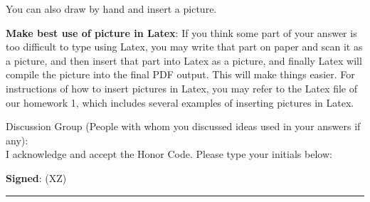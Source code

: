 \documentclass[12pt]{article}
\begin{document}
You can also draw by hand and insert a picture.

\vspace{.5cm}

\textbf{Make best use of picture in Latex}: If you think some part of your answer is too difficult to type using Latex, you may write that part on paper and scan it as a picture, and then insert that part into Latex as a picture, and finally Latex will compile the picture into the final PDF output. This will make things easier. For instructions of how to insert pictures in Latex, you may refer to the Latex file of our homework 1, which includes several examples of inserting pictures in Latex.


\hrulefill

Discussion Group (People with whom you discussed ideas used in your answers if any):     \\[1ex]


I acknowledge and accept the Honor Code. Please type your initials below:

\textbf{Signed}: ({\color{blue}XZ})



\rule{\linewidth}{0.4pt}
\end{document}
